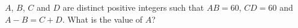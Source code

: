 $A$, $B$, $C$ and $D$ are distinct positive integers such that $AB=60$, $CD=60$ and $A-B=C+D$. What is the value of $A$?
